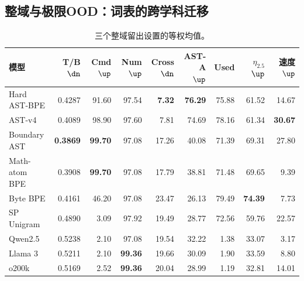 \subsection{整域与极限OOD：词表的跨学科迁移}
\par\begin{table}[H]\centering\small
\caption{三个整域留出设置的等权均值。}\label{tab:ood}
\begin{tabular}{lrrrrrrrr}\toprule
模型 & T/B $\dn$ & Cmd $\up$ & Num $\up$ & Cross $\dn$ & AST-A $\up$ & Used & $\eta_{2.5}$ $\up$ & 速度 $\up$ \\\midrule
Hard AST-BPE & 0.4287 & 91.60 & 97.54 & \textbf{7.32} & \textbf{76.29} & 75.88 & 61.52 & 14.67 \\
AST-v4 & 0.4089 & 98.90 & 97.60 & 7.81 & 74.69 & 78.16 & 61.34 & \textbf{30.67} \\
Boundary AST & \textbf{0.3869} & \textbf{99.70} & 97.08 & 17.26 & 40.08 & 71.39 & 69.31 & 27.80 \\
Math-atom BPE & 0.3908 & \textbf{99.70} & 97.08 & 17.79 & 38.81 & 71.48 & 69.65 & 9.39 \\
Byte BPE & 0.4161 & 46.20 & 97.08 & 23.47 & 26.13 & 79.49 & \textbf{74.39} & 7.73 \\
SP Unigram & 0.4890 & 3.09 & 97.92 & 19.49 & 28.77 & 72.56 & 59.76 & 22.57 \\
\midrule
Qwen2.5 & 0.5238 & 2.10 & 97.08 & 19.54 & 32.22 & 1.38 & 33.07 & 3.17 \\
Llama 3 & 0.5211 & 2.10 & \textbf{99.36} & 19.66 & 30.09 & 1.90 & 33.59 & 8.80 \\
o200k & 0.5169 & 2.52 & \textbf{99.36} & 20.04 & 28.99 & 1.19 & 32.81 & 14.01 \\
\bottomrule\end{tabular}
\end{table}\par

